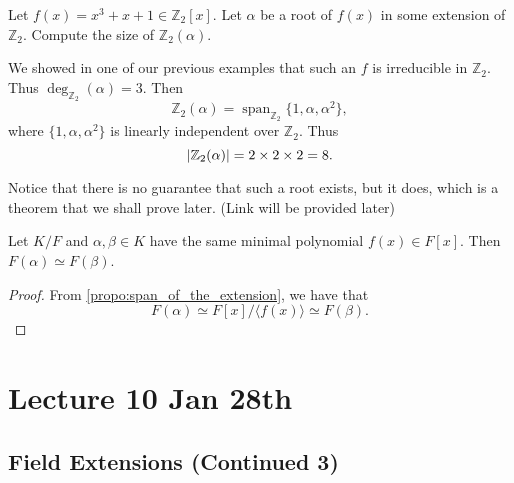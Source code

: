 \documentclass[notoc,notitlepage]{tufte-book}
\DeclareMathOperator{\Span}{span}
\begin{document}
\begin{eg}
  Let $f(x) = x^3 + x + 1 \in \mathbb{Z}_2[x]$. Let $\alpha$ be a root of $f(x)$ in some extension of
  $\mathbb{Z}_2$. Compute the size of $\mathbb{Z}_2(\alpha)$.
\end{eg}

\begin{solution}
  We showed in one of our previous examples that such an $f$ is irreducible in $\mathbb{Z}_2$. Thus
  $\deg_{\mathbb{Z}_2}(\alpha) = 3$. Then
  \begin{equation*}
    \mathbb{Z}_2(\alpha) = \Span_{\mathbb{Z}_2} \{ 1, \alpha, \alpha^2 \}, 
  \end{equation*}
  where $\{ 1, \alpha, \alpha^2 \}$ is linearly independent over $\mathbb{Z}_2$. Thus
  \begin{equation*}
    \left|\mathbb{Z}_2(\alpha)\right| = 2 \times 2 \times 2 = 8.
  \end{equation*}
\end{solution}

\begin{note}
  Notice that there is no guarantee that such a root exists, but it does, which is a theorem that we shall
  prove later. (Link will be provided later) %
\end{note}

\begin{crly}\label{crly:isomorphism_between_extensions}
  Let $K / F$ and $\alpha, \beta \in K$ have the same minimal polynomial $f(x) \in F[x]$. Then
  $F(\alpha) \simeq F(\beta)$.
\end{crly}

\begin{proof}
  From \cref{propo:span_of_the_extension}, we have that
  \begin{equation*}
    F(\alpha) \simeq F[x] / \langle f(x) \rangle \simeq F(\beta).
  \end{equation*}
\end{proof}



\chapter{Lecture 10 Jan 28th}%
\label{chp:lecture_10_jan_28th}

\section{Field Extensions (Continued 3)}%
\label{sec:field_extensions_continued_3}
\end{document}
